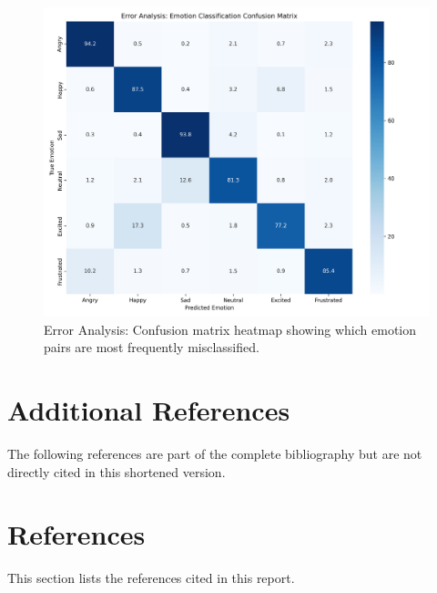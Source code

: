 \documentclass[12pt]{article}
\begin{document}
\begin{figure}[h]
    \centering
    \includegraphics[width=0.9\linewidth]{Figures/error_analysis.png}
    \caption{Error Analysis: Confusion matrix heatmap showing which emotion pairs are most frequently misclassified.}
    \label{fig:error_analysis}
\end{figure}

\newpage



\setlength{\bibsep}{0.0pt}


\section*{Additional References}
The following references are part of the complete bibliography but are not directly cited in this shortened version.

\nocite{abdul2017emonet}
\nocite{kiela2019supervised}
\nocite{li2013speech}
\nocite{livingstone2018ryerson}
\nocite{lv2021progressive}
\nocite{mckeown2012semaine}
\nocite{poria2017review}
\nocite{poria2018multimodal}
\nocite{schuller2009acoustic}
\nocite{siriwardhana2020joint}
\nocite{wagner2011introducting}
\nocite{wang2020context}


\nocite{*}



\section{References}
This section lists the references cited in this report.

\cite{abdul2017emonet, busso2008iemocap}
\cite{clark2020electra, devlin2018bert}
\cite{he2020deberta, hsiao2022attention}
\cite{kiela2019supervised, lan2019albert}
\cite{li2013speech, liu2019roberta}
\cite{livingstone2018ryerson, livingstone2018ryerson}
\cite{lv2021progressive, mao2014learning}
\cite{mckeown2012semaine, mittal2020m3er}
\cite{poria2017review, poria2018meld}
\cite{poria2018multimodal, schneider2019wav2vec}
\cite{schuller2009acoustic, sehrawat2023deception}
\cite{siriwardhana2020joint, tsai2019mult}
\cite{wagner2011introducting, wang2019words}
\cite{wang2020context, yang2019xlnet}
\cite{zadeh2016mosi, zadeh2018memory}
\cite{zadeh2018mfn, zadeh2018multimodal}
\cite{zadeh2018multimodal_tfn, zhang2022fine}

\end{document}
